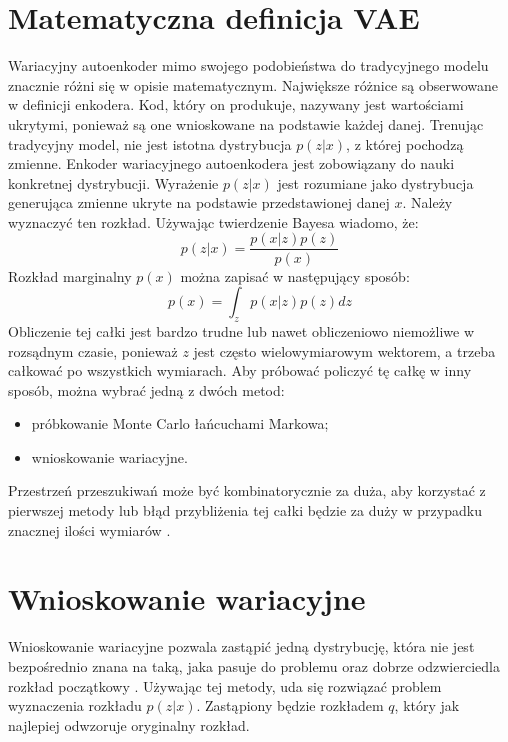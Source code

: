 \documentclass[a4paper,12pt,oneside]{book} %
\begin{document}
\section{Matematyczna definicja VAE}
Wariacyjny autoenkoder mimo swojego podobieństwa do tradycyjnego modelu znacznie różni się w opisie matematycznym. Największe różnice są obserwowane w definicji enkodera. Kod, który on produkuje, nazywany jest wartościami ukrytymi, ponieważ są one wnioskowane na podstawie każdej danej. Trenując tradycyjny model, nie jest istotna dystrybucja $p(z|x)$, z której pochodzą zmienne. Enkoder wariacyjnego autoenkodera jest zobowiązany do nauki konkretnej dystrybucji. Wyrażenie $p(z|x)$ jest rozumiane jako dystrybucja generująca zmienne ukryte na podstawie przedstawionej danej $x$. Należy wyznaczyć ten rozkład. Używając twierdzenie Bayesa wiadomo, że:
\begin{equation}
	p(z|x)=\dfrac{p(x|z)p(z)}{p(x)}
	\label{bayes}
\end{equation}
Rozkład marginalny $p(x)$ można zapisać w następujący sposób:
\begin{equation}
	p(x) = \displaystyle\int_{z}^{}p(x|z)p(z)dz
	\label{pxcalka}
\end{equation}
Obliczenie tej całki jest bardzo trudne lub nawet obliczeniowo niemożliwe w rozsądnym czasie, ponieważ $z$ jest często wielowymiarowym wektorem, a trzeba całkować po wszystkich wymiarach. Aby próbować policzyć tę całkę w inny sposób, można wybrać jedną z dwóch metod:
\begin{itemize}
	\item próbkowanie Monte Carlo łańcuchami Markowa;
	\item wnioskowanie wariacyjne.
\end{itemize}
Przestrzeń przeszukiwań może być kombinatorycznie za duża, aby korzystać z pierwszej metody lub błąd przybliżenia tej całki będzie za duży w przypadku znacznej ilości wymiarów \cite{salimans2015markov}.

\section{Wnioskowanie wariacyjne}
Wnioskowanie wariacyjne pozwala zastąpić jedną dystrybucję, która nie jest bezpośrednio znana na taką, jaka pasuje do problemu oraz dobrze odzwierciedla rozkład początkowy \cite{variationalinference}. Używając tej metody, uda się rozwiązać problem wyznaczenia rozkładu $p(z|x)$. Zastąpiony będzie rozkładem $q$, który jak najlepiej odwzoruje oryginalny rozkład. 
\end{document}
